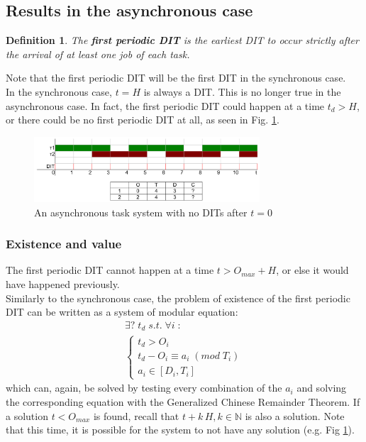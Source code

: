 \documentclass[a4paper,10pt]{article}
\newtheorem{definition}{Definition}
\begin{document}
\subsection{Results in the asynchronous case}

\begin{definition}
The \textbf{first periodic DIT} is the earliest DIT to occur strictly after the arrival of at least one job of each task.
\end{definition}

Note that the first periodic DIT will be the first DIT in the synchronous case.\\

In the synchronous case, $t = H$ is always a DIT. This is no longer true in the asynchronous case. In fact, the first periodic DIT could happen at a time $t_d > H$, or there could be no first periodic DIT at all, as seen in Fig. \ref{fig:asyncNoDit}.

\begin{figure}[h]
\begin{center}
\includegraphics[width=0.75\textwidth]{figs/dit_asynchronousNoDit.png}
\caption{An asynchronous task system with no DITs after $t=0$}
\label{fig:asyncNoDit}
\end{center}
\end{figure}

\subsubsection{Existence and value}

The first periodic DIT cannot happen at a time $t > O_{max} + H$, or else it would have happened previously.\\

Similarly to the synchronous case, the problem of existence of the first periodic DIT can be written as a system of modular equation:
$$
\begin{array}{l}
	\exists ? \; t_d \; s.t. \; \forall i \; :\\
	\left\{
		\begin{array}{l}
		t_d > O_i \\
		t_d - O_i \equiv a_i \; (mod \; T_i) \\
		a_i \in [D_i, T_i]
	\end{array}
\right.
\end{array}
$$
which can, again, be solved by testing every combination of the $a_i$ and solving the corresponding equation with the Generalized Chinese Remainder Theorem. If a solution $t < O_{max}$ is found, recall that $t + k \, H, k \in \mathbb{N}$ is also a solution. Note that this time, it is possible for the system to not have any solution (e.g. Fig \ref{fig:asyncNoDit}).
\end{document}
